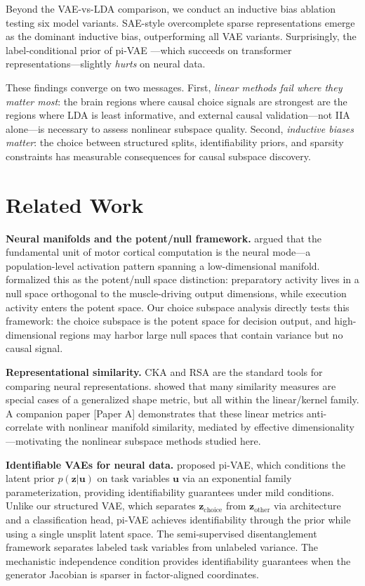 \documentclass{article}
\begin{document}
Beyond the VAE-vs-LDA comparison, we conduct an inductive bias ablation testing six model variants. SAE-style overcomplete sparse representations emerge as the dominant inductive bias, outperforming all VAE variants. Surprisingly, the label-conditional prior of pi-VAE \citep{zhou2020pivae}---which succeeds on transformer representations---slightly \emph{hurts} on neural data.

These findings converge on two messages. First, \emph{linear methods fail where they matter most}: the brain regions where causal choice signals are strongest are the regions where LDA is least informative, and external causal validation---not IIA alone---is necessary to assess nonlinear subspace quality. Second, \emph{inductive biases matter}: the choice between structured splits, identifiability priors, and sparsity constraints has measurable consequences for causal subspace discovery.

\section{Related Work}

\textbf{Neural manifolds and the potent/null framework.} \citet{gallego2017neural} argued that the fundamental unit of motor cortical computation is the neural mode---a population-level activation pattern spanning a low-dimensional manifold. \citet{kaufman2014cortical} formalized this as the potent/null space distinction: preparatory activity lives in a null space orthogonal to the muscle-driving output dimensions, while execution activity enters the potent space. Our choice subspace analysis directly tests this framework: the choice subspace is the potent space for decision output, and high-dimensional regions may harbor large null spaces that contain variance but no causal signal.

\textbf{Representational similarity.} CKA \citep{kornblith2019similarity} and RSA \citep{kriegeskorte2008representational} are the standard tools for comparing neural representations. \citet{williams2021generalized} showed that many similarity measures are special cases of a generalized shape metric, but all within the linear/kernel family. A companion paper [Paper A] demonstrates that these linear metrics anti-correlate with nonlinear manifold similarity, mediated by effective dimensionality---motivating the nonlinear subspace methods studied here.

\textbf{Identifiable VAEs for neural data.} \citet{zhou2020pivae} proposed pi-VAE, which conditions the latent prior $p(\mathbf{z}|\mathbf{u})$ on task variables $\mathbf{u}$ via an exponential family parameterization, providing identifiability guarantees under mild conditions. Unlike our structured VAE, which separates $\mathbf{z}_{\text{choice}}$ from $\mathbf{z}_{\text{other}}$ via architecture and a classification head, pi-VAE achieves identifiability through the prior while using a single unsplit latent space. The semi-supervised disentanglement framework \citep{narayanaswamy2017learning} separates labeled task variables from unlabeled variance. The mechanistic independence condition \citep{khemakhem2020variational} provides identifiability guarantees when the generator Jacobian is sparser in factor-aligned coordinates.
\end{document}
